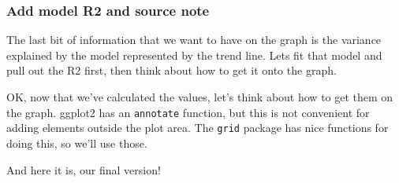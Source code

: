 \documentclass[]{book}
\newenvironment{Shaded}{\begin{snugshade}}{\end{snugshade}}
\newcommand{\KeywordTok}[1]{\textcolor[rgb]{0.13,0.29,0.53}{\textbf{#1}}}
\newcommand{\DataTypeTok}[1]{\textcolor[rgb]{0.13,0.29,0.53}{#1}}
\newcommand{\DecValTok}[1]{\textcolor[rgb]{0.00,0.00,0.81}{#1}}
\newcommand{\StringTok}[1]{\textcolor[rgb]{0.31,0.60,0.02}{#1}}
\newcommand{\OperatorTok}[1]{\textcolor[rgb]{0.81,0.36,0.00}{\textbf{#1}}}
\newcommand{\NormalTok}[1]{#1}
\begin{document}
\subsubsection{Add model R2 and source
note}\label{add-model-r2-and-source-note}

The last bit of information that we want to have on the graph is the
variance explained by the model represented by the trend line. Lets fit
that model and pull out the R2 first, then think about how to get it
onto the graph.

\begin{Shaded}
\end{Shaded}

OK, now that we've calculated the values, let's think about how to get
them on the graph. ggplot2 has an \texttt{annotate} function, but this
is not convenient for adding elements outside the plot area. The
\texttt{grid} package has nice functions for doing this, so we'll use
those.

And here it is, our final version!
\end{document}
